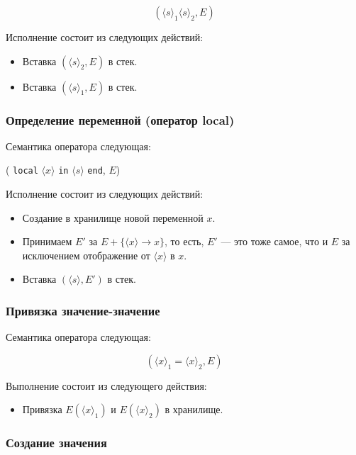 $$( {\langle s \rangle}_{1} {\langle s \rangle}_{2}, E)$$

Исполнение состоит из следующих действий:

\begin{itemize}
\item{Вставка $( {\langle s \rangle}_{2}, E)$ в стек.}

\item{Вставка $( {\langle s \rangle}_{1}, E)$ в стек.}
\end{itemize}

\subsubsection{Определение переменной (оператор local)}

Семантика оператора следующая:

( \lstinline|local| $\langle x \rangle$ \lstinline|in| $\langle s \rangle$ \lstinline|end|, $E$)

Исполнение состоит из следующих действий:

\begin{itemize}
\item{Создание в хранилище новой переменной $x$.}

\item{Принимаем $E'$ за $E+\{ \langle x \rangle \to x\}$, то есть, $E'$ --- это тоже самое, что и $E$ за исключением отображение от $\langle x \rangle$ в $x$.}

\item{Вставка $(\langle s \rangle,E')$ в стек.}
\end{itemize}

\subsubsection{Привязка значение-значение}

Семантика оператора следующая:

$$({\langle x \rangle}_{1} = {\langle x \rangle}_{2},E)$$

Выполнение состоит из следующего действия:

\begin{itemize}
\item{Привязка $E({\langle x \rangle}_{1})$ и $E({\langle x \rangle}_{2})$ в хранилище.}
\end{itemize}

\subsubsection{Создание значения}

